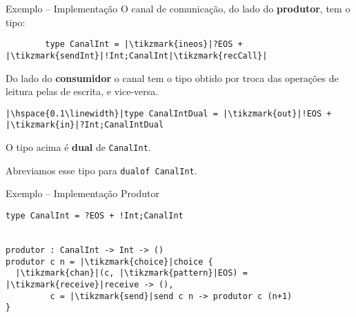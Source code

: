 \begin{frame}[fragile]{Exemplo -- Implementação}
  O canal de comunicação, do lado do \textbf{produtor}, tem o tipo:
  \vspace*{4mm}
  \begin{lstlisting}
        type CanalInt = |\tikzmark{ineos}|?EOS + |\tikzmark{sendInt}|!Int;CanalInt|\tikzmark{recCall}|
\end{lstlisting} 
 
 

 Do lado do \textbf{consumidor} o canal tem o tipo obtido por troca das operações de leitura pelas de escrita, e vice-versa.
\vspace*{4mm} 
\begin{lstlisting}
|\hspace{0.1\linewidth}|type CanalIntDual = |\tikzmark{out}|!EOS + |\tikzmark{in}|?Int;CanalIntDual
\end{lstlisting}


\centering
\begin{tcolorbox}
  O tipo acima é \textbf{dual} de \lstinline|CanalInt|.

  Abreviamos esse tipo para \lstinline|dualof CanalInt|.
\end{tcolorbox}

\end{frame}

\begin{frame}[fragile]{Exemplo -- Implementação  \hfill \color{mLightBrown}Produtor}
  \begin{lstlisting}[xrightmargin=.15\textwidth]
type CanalInt = ?EOS + !Int;CanalInt

    
produtor : CanalInt -> Int -> ()
produtor c n = |\tikzmark{choice}|choice {
  |\tikzmark{chan}|(c, |\tikzmark{pattern}|EOS) = |\tikzmark{receive}|receive -> (),
         c = |\tikzmark{send}|send c n -> produtor c (n+1)
}
  \end{lstlisting}



\end{frame}


